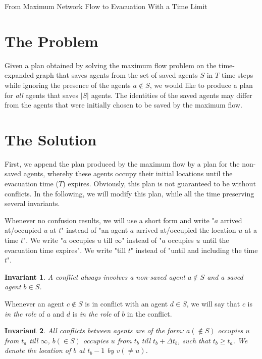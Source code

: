 \documentclass[a4paper,12pt]{article}
\newtheorem{invar}{Invariant}
\newcommand{\I}[1]{\begin{invar}{\em #1}\end{invar}}
\begin{document}
\sloppy
\LARGE
\begin{center}
From Maximum Network Flow to Evacuation With a Time Limit

\end{center}
\normalsize

\section{The Problem}
Given a plan obtained by solving the maximum flow problem on the time-expanded graph that saves agents from the set of saved agents $S$ in $T$ time steps while ignoring the presence of the agents $a\notin S$, we would like to produce a plan for {\em all} agents that saves $|S|$ agents. The identities of the saved agents may differ from the agents that were initially chosen to be saved by the maximum flow. 

\section{The Solution}
First, we append the plan produced by the maximum flow by a plan for the non-saved agents, whereby these agents occupy their initial locations until the evacuation time ($T$) expires. Obviously, this plan is not guaranteed to be without conflicts. In the following, we will modify this plan, while all the time preserving several invariants. 

Whenever no confusion results, we will use a short form and write "$a$ arrived at/occupied $u$ at $t$" instead of "an agent $a$ arrived at/occupied the location $u$ at a time $t$". We write "$a$ occupies $u$ till $\infty$" instead of "$a$ occupies $u$ until the evacuation time expires". We write "till $t$" instead of "until and including the time $t$".

\I{A conflict always involves a non-saved agent $a\notin S$ and a saved agent $b\in S$. \label{mixedConflicts}}

Whenever an agent $c\notin S$ is in conflict with an agent $d\in S$, we will say that $c$ is {\em in the role} of $a$ and $d$ is {\em in the role} of $b$ in the conflict.

\I{All conflicts between agents are of the form: $a(\notin S)$ occupies $u$ from $t_a$ till $\infty$, $b(\in S)$ occupies $u$ from $t_b$ till $t_b+\Delta t_b$, such that $t_b\ge t_a$. We denote the location of $b$ at $t_b-1$ by $v(\neq u)$.\label{cf}}

\vspace{0.5cm}
\end{document}
